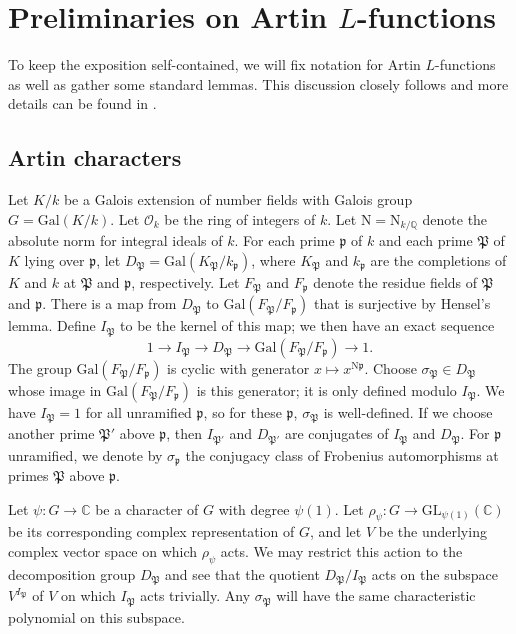 \documentclass[12pt]{amsart}
\theoremstyle{definition} \newtheorem{definition}[theorem]{Definition}
\theoremstyle{example} \newtheorem{example}[theorem]{Example}
\theoremstyle{remark} \newtheorem{remark}{Remark}[theorem]
\numberwithin{equation}{section}
\numberwithin{theorem}{section}
\newcommand{\N}{\mathrm{N}} %
\newcommand{\Q}{\mathbb{Q}}
\newcommand{\kp}{\mathfrak{p}}
\newcommand{\Gal}{\mathrm{Gal}}
\begin{document}
\section{Preliminaries on Artin $L$-functions}
	\label{sec:prelim}

To keep the exposition self-contained, we will fix notation for Artin $L$-functions as well as gather some standard lemmas. This discussion closely follows \cite[Section 4]{LemkeOliverThornerZaman-ApproximateArtin} and more details can be found in \cite[Chapter 2]{MurtyMurty-Nonvanishing}.  

\subsection{Artin characters} Let $K/k$ be a Galois extension of number fields with Galois group $G=\Gal(K/k)$. Let $\mathcal{O}_k$ be the ring of integers of $k$. Let $\N = \mathrm{N}_{k/\Q}$ denote the absolute norm for integral ideals of $k$. For each prime $\kp$ of $k$ and each prime $\mathfrak{P}$ of $K$ lying over $\mathfrak{p}$, let $D_{\mathfrak{P}}=\Gal(K_{\mathfrak{P}}/k_{\kp})$, where $K_{\mathfrak{P}}$ and $k_{\kp}$ are the completions of $K$ and $k$ at $\mathfrak{P}$ and $\kp$, respectively.  Let $F_\mathfrak{P}$ and $F_\mathfrak{p}$ denote the residue fields of $\mathfrak{P}$ and $\mathfrak{p}$.  There is a map from $D_{\mathfrak{P}}$ to $\Gal(F_{\mathfrak{P}}/F_{\kp})$ that is surjective by Hensel's lemma.  Define $I_{\mathfrak{P}}$ to be the kernel of this map; we then have an exact sequence
\[
1\to I_{\mathfrak{P}}\to D_{\mathfrak{P}}\to \Gal(F_{\mathfrak{P}}/F_{\kp})\to 1.
\]
The group $\Gal(F_{\mathfrak{P}}/F_{\kp})$ is cyclic with generator $x\mapsto x^{\N\kp}$.  Choose $\sigma_{\mathfrak{P}}\in D_{\mathfrak{P}}$ whose image in $\Gal(F_{\mathfrak{P}}/F_{\kp})$ is this generator; it is only defined modulo $I_{\mathfrak{P}}$.  We have $I_{\mathfrak{P}}=1$ for all unramified $\kp$, so for these $\kp$, $\sigma_{\mathfrak{P}}$ is well-defined.   If we choose another prime $\mathfrak{P}'$ above $\kp$, then $I_{\mathfrak{P}'}$ and $D_{\mathfrak{P}'}$ are conjugates of $I_{\mathfrak{P}}$ and $D_{\mathfrak{P}}$.  For $\kp$ unramified, we denote by $\sigma_{\kp}$ the conjugacy class of Frobenius automorphisms at primes $\mathfrak{P}$ above $\kp$.

Let $\psi : G \to \mathbb{C}$ be a character of $G$ with degree $\psi(1)$. Let $\rho_{\psi}\colon G \to\mathrm{GL}_{\psi(1)}(\mathbb{C})$ be its corresponding complex representation of $G$, and let $V$ be the underlying complex vector space on which $\rho_{\psi}$ acts.  We may restrict this action to the decomposition group $D_{\mathfrak{P}}$ and see that the quotient $D_{\mathfrak{P}}/I_{\mathfrak{P}}$ acts on the subspace $V^{I_{\mathfrak{P}}}$ of $V$ on which $I_{\mathfrak{P}}$ acts trivially.  Any $\sigma_{\mathfrak{P}}$ will have the same characteristic polynomial on this subspace.  
\end{document}

